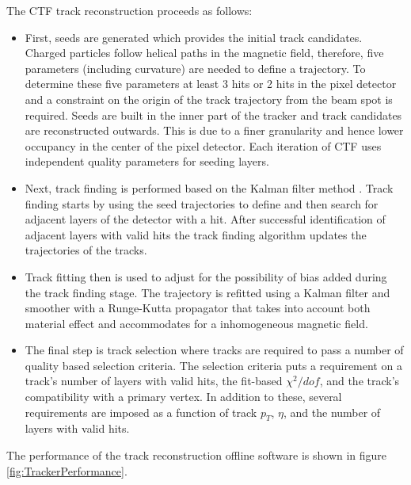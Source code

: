 The CTF track reconstruction proceeds as follows:
\begin{itemize}
\item First, seeds are generated which provides the initial track candidates.
Charged particles follow helical paths in the magnetic field, therefore, five parameters (including curvature)
are needed to define a trajectory. To determine these five parameters at least
3 hits or 2 hits in the pixel detector and a constraint on the origin of the track trajectory from the beam
spot is required. Seeds are built in the inner part of the tracker
and track candidates are reconstructed outwards. This is due to a finer granularity 
and hence lower occupancy in the center of the pixel detector. Each iteration of CTF
uses independent quality parameters for seeding layers. 
\item Next, track finding is performed based on the Kalman filter method \cite{KalmanFilter}.
Track finding starts by using the seed trajectories to define and then search
for adjacent layers of the detector with a hit. 
After successful identification of adjacent layers with valid hits 
the track finding algorithm updates the trajectories of the tracks. 
\item Track fitting then is used to adjust for the possibility of bias added during the track
finding stage. The trajectory is refitted using a Kalman filter and smoother with
a Runge-Kutta propagator that takes into account both material effect and accommodates
for a inhomogeneous magnetic field.
\item The final step is track selection where tracks are required to pass a number of quality
based selection criteria. 
The selection criteria puts a requirement on a track's number of layers 
with valid hits, the fit-based $\chi^{2}/dof$, and the track's compatibility
with a primary vertex. In addition to these, several requirements are
imposed as a function of track $p_{T}$, $\eta$, and the number of layers
with valid hits. 
\end{itemize}
The performance of the track reconstruction
offline software is shown in figure \ref{fig:TrackerPerformance}.
